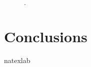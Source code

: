 \documentclass[apj]{emulateapj}
\begin{document}
\begin{figure}
  \begin{center}
  \end{center}
\caption[]{.}
 \label{fig:gaussian}
\end{figure}




\section{Conclusions}

\acknowledgments

\begin{thebibliography}{}
\expandafter\ifx\csname natexlab\endcsname\relax\def\natexlab#1{#1}\fi
\end{thebibliography}
\end{document}
